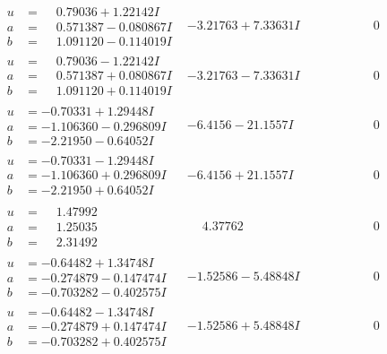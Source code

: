 \documentclass[1p]{elsarticle_modified}
\theoremstyle{definition}
\begin{document}
$$\begin{array}{c|c|c}
\begin{aligned}
u &= \phantom{-}0.79036 + 1.22142 I \\
a &= \phantom{-}0.571387 - 0.080867 I \\
b &= \phantom{-}1.091120 - 0.114019 I\end{aligned}
 & -3.21763 + 7.33631 I & \phantom{-0.000000 } 0 \\ \hline\begin{aligned}
u &= \phantom{-}0.79036 - 1.22142 I \\
a &= \phantom{-}0.571387 + 0.080867 I \\
b &= \phantom{-}1.091120 + 0.114019 I\end{aligned}
 & -3.21763 - 7.33631 I & \phantom{-0.000000 } 0 \\ \hline\begin{aligned}
u &= -0.70331 + 1.29448 I \\
a &= -1.106360 - 0.296809 I \\
b &= -2.21950 - 0.64052 I\end{aligned}
 & -6.4156 - 21.1557 I & \phantom{-0.000000 } 0 \\ \hline\begin{aligned}
u &= -0.70331 - 1.29448 I \\
a &= -1.106360 + 0.296809 I \\
b &= -2.21950 + 0.64052 I\end{aligned}
 & -6.4156 + 21.1557 I & \phantom{-0.000000 } 0 \\ \hline\begin{aligned}
u &= \phantom{-}1.47992\phantom{ +0.000000I} \\
a &= \phantom{-}1.25035\phantom{ +0.000000I} \\
b &= \phantom{-}2.31492\phantom{ +0.000000I}\end{aligned}
 & \phantom{-}4.37762\phantom{ +0.000000I} & \phantom{-0.000000 } 0 \\ \hline\begin{aligned}
u &= -0.64482 + 1.34748 I \\
a &= -0.274879 - 0.147474 I \\
b &= -0.703282 - 0.402575 I\end{aligned}
 & -1.52586 - 5.48848 I & \phantom{-0.000000 } 0 \\ \hline\begin{aligned}
u &= -0.64482 - 1.34748 I \\
a &= -0.274879 + 0.147474 I \\
b &= -0.703282 + 0.402575 I\end{aligned}
 & -1.52586 + 5.48848 I & \phantom{-0.000000 } 0 \\ \hline\begin{aligned}

\end{aligned}
\end{array}$$
\end{document}
